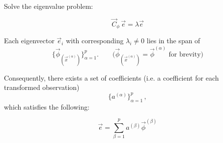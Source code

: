 \begin{frame}{\subsubsecname}

Solve the eigenvalue problem:

\begin{equation} \label{eq:eig}
\vec C_{\phi} \, \vec e = \lambda \vec e
\end{equation}

Each eigenvector $\vec e_i$ with corresponding $\lambda_i \ne 0$ lies in the span of 
\begin{equation}
\big\{
\vec{\phi}_{(\vec{x}^{(\alpha)})}
\big\}_{\alpha=1}^{p}. \qquad \big(\vec{\phi}_{(\vec{x}^{(\alpha)})} = \vec{\phi}^{(\alpha)} \text{ for brevity}\big)
\end{equation}

\pause

Consequently, there exists a set of coefficients (i.e. a coefficient for each transformed observation)
\begin{equation}
\big\{
a^{(\alpha)}
\big\}_{\alpha=1}^{p}\,,
\end{equation} which satisfies the following:

\begin{equation}
\label{eq:ephi}
\vec e = \sum^{p}_{\beta=1} a^{(\beta)} 
\vec{\phi}^{(\beta)}
\end{equation}


\end{frame}

